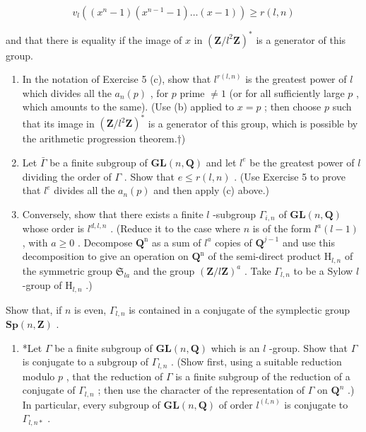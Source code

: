 \[
v _ {l} ((x ^ {n} - 1) (x ^ {n - 1} - 1) \dots (x - 1)) \geqslant r (l, n)
\]

and that there is equality if the image of \(x\) in \((\mathbf{Z} / l^2\mathbf{Z})^*\) is a generator of this group.

\begin{enumerate}
\def\labelenumi{(\alph{enumi})}
\setcounter{enumi}{2}
\item
  In the notation of Exercise 5 (c), show that \(l^{r(l,n)}\) is the greatest power of \(l\) which divides all the \(a_{n}(p)\) , for \(p\) prime \(\neq 1\) (or for all sufficiently large \(p\) , which amounts to the same). (Use (b) applied to \(x = p\) ; then choose \(p\) such that its image in \((\mathbf{Z}/l^2\mathbf{Z})^*\) is a generator of this group, which is possible by the arithmetic progression theorem.†)
\item
  Let \(\bar{\Gamma}\) be a finite subgroup of \(\mathbf{GL}(n, \mathbf{Q})\) and let \(l^e\) be the greatest power of \(l\) dividing the order of \(\Gamma\) . Show that \(e \leqslant r(l, n)\) . (Use Exercise 5 to prove that \(l^e\) divides all the \(a_n(p)\) and then apply (c) above.)
\item
  Conversely, show that there exists a finite \(l\) -subgroup \(\Gamma_{i,n}\) of \(\mathbf{GL}(n,\mathbf{Q})\) whose order is \(l^{d,l,n}\) . (Reduce it to the case where \(n\) is of the form \(l^a (l - 1)\) , with \(a\geqslant 0\) . Decompose \(\mathbf{Q}^{\mathrm{n}}\) as a sum of \(l^a\) copies of \(\mathbf{Q}^{j - 1}\) and use this decomposition to give an operation on \(\mathbf{Q}^{\mathrm{n}}\) of the semi-direct product \(\mathrm{H}_{l,n}\) of the symmetric group \(\mathfrak{S}_{la}\) and the group \((\mathbf{Z} / l\mathbf{Z})^{a}\) . Take \(\Gamma_{l,n}\) to be a Sylow \(l\) -group of \(\mathrm{H}_{l,n}\) .)
\end{enumerate}

Show that, if \(n\) is even, \(\Gamma_{l,n}\) is contained in a conjugate of the symplectic group \(\mathbf{Sp}(n,\mathbf{Z})\) .

\begin{enumerate}
\def\labelenumi{(\alph{enumi})}
\setcounter{enumi}{5}
\tightlist
\item
  *Let \(\Gamma\) be a finite subgroup of \(\mathbf{GL}(n, \mathbf{Q})\) which is an \(l\) -group. Show that \(\Gamma\) is conjugate to a subgroup of \(\Gamma_{l,n}\) . (Show first, using a suitable reduction modulo \(p\) , that the reduction of \(\Gamma\) is a finite subgroup of the reduction of a conjugate of \(\Gamma_{l,n}\) ; then use the character of the representation of \(\Gamma\) on \(\mathbf{Q}^{n}\) .) In particular, every subgroup of \(\mathbf{GL}(n, \mathbf{Q})\) of order \(l^{(l,n)}\) is conjugate to \(\Gamma_{l,n*}\) .
\end{enumerate}

